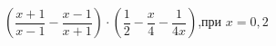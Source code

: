 \begin{ex}[type=simplify_calculate]
	\begin{condition}
		\( \left( \dfrac{x+1}{x-1}-\dfrac{x-1}{x+1} \right)\cdot\left( \dfrac{1}{2}-\dfrac{x}{4}-\dfrac{1}{4x} \right) \),\quad при \( x=0,2 \)
	\end{condition}
\end{ex}